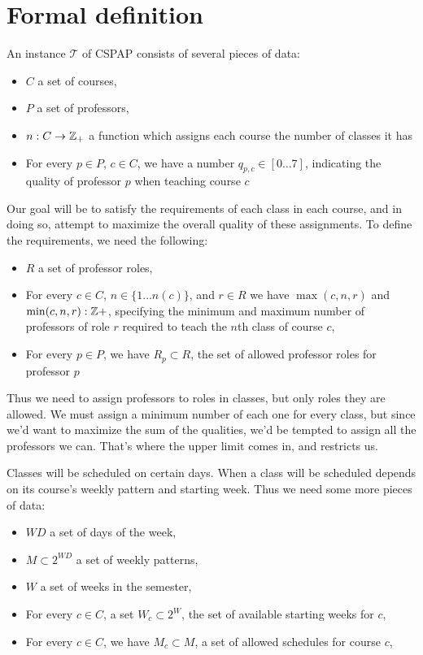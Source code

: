 \section{Formal definition}
An instance $\mathcal{T}$ of CSPAP consists of several pieces of data:

\begin{itemize}
\item $C$ a set of courses,
\item $P$ a set of professors,
\item $n: C \to \mathbb{Z}_+$ a function which assigns each course the number of classes it has
\item For every $p \in P$, $c \in C$, we have a number $q_{p, c} \in [0 \dots 7]$, indicating the quality of professor $p$ when teaching course $c$
\end{itemize}

Our goal will be to satisfy the requirements of each class in each course, and in doing so, attempt to maximize the overall quality of these assignments. To define the requirements, we need the following:
\begin{itemize}
\item $R$ a set of professor roles,
\item For every $c \in C$, $n \in \{1 \dots n(c)\}$, and $r \in R$ we have $\max(c, n, r)$ and $\min(c, n, r): \mathbb{Z}+$, specifying the minimum and maximum number of professors of role $r$ required to teach the $n$th class of course $c$,
\item For every $p \in P$, we have $R_p \subset R$, the set of allowed professor roles for professor $p$
\end{itemize}

Thus we need to assign professors to roles in classes, but only roles they are allowed. We must assign a minimum number of each one for every class, but since we'd want to maximize the sum of the qualities, we'd be tempted to assign all the professors we can. That's where the upper limit comes in, and restricts us.

Classes will be scheduled on certain days. When a class will be scheduled depends on its course's weekly pattern and starting week. Thus we need some more pieces of data:
\begin{itemize}
\item $WD$ a set of days of the week,
\item $M \subset 2^{WD}$ a set of weekly patterns,
\item $W$ a set of weeks in the semester,
\item For every $c \in C$, a set $W_c \subset 2^W$, the set of available starting weeks for $c$,
\item For every $c \in C$, we have $M_c \subset M$, a set of allowed schedules for course $c$,
\end{itemize}

